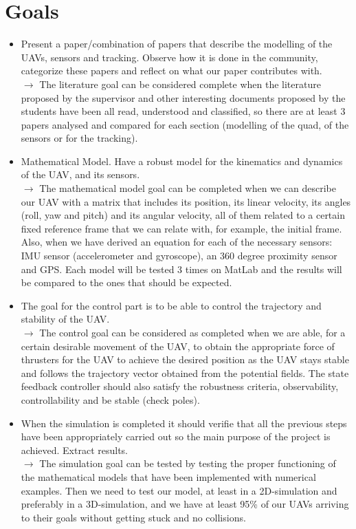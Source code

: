 \documentclass{article}
\begin{document}
	\section{Goals}	 
	\begin{itemize}
		\item Present a paper/combination of papers that describe the modelling of the UAVs, sensors and tracking. Observe how it is done in the community, categorize these papers and reflect on what our paper contributes with.\\  
		$\rightarrow$ The literature goal can be considered complete when the literature proposed by the supervisor and other interesting documents proposed by the students have been all read, understood and classified, so there are at least 3 papers analysed and compared for each section (modelling of the quad, of the sensors or for the tracking). %
	
		\item Mathematical Model. Have a robust model for the kinematics and dynamics of the UAV, and its sensors.\\
		$\rightarrow$ The mathematical model goal can be completed when we can describe our UAV with a matrix that includes its position, its linear velocity, its angles (roll, yaw and pitch) and its angular velocity, all of them related to a certain fixed reference frame that we can relate with, for example, the initial frame. Also, when we have derived an equation for each of the necessary sensors: IMU sensor (accelerometer and gyroscope), an 360 degree proximity sensor and GPS. Each model will be tested 3 times on MatLab and the results will be compared to the ones that should be expected.
		
		\item The goal for the control part is to be able to control the trajectory and stability of the UAV. \\
		$\rightarrow$ The control goal can be considered as completed when we are able, for a certain desirable movement of the UAV, to obtain the appropriate force of thrusters for the UAV to achieve the desired position as the UAV stays stable and follows the trajectory vector obtained from the potential fields. The state feedback controller should also satisfy the robustness criteria, observability, controllability and be stable (check poles).
		
		\item When the simulation is completed it should verifie that all the previous steps have been appropriately carried out so the main purpose of the project is achieved. Extract results. \\
		$\rightarrow$ The simulation goal can be tested by testing the proper functioning of the mathematical models that have been implemented with numerical examples. Then we need to test our model, at least in a 2D-simulation and preferably in a 3D-simulation, and we have at least 95\% of our UAVs arriving to their goals without getting stuck and no collisions. 
		

\end{itemize}
\end{document}
